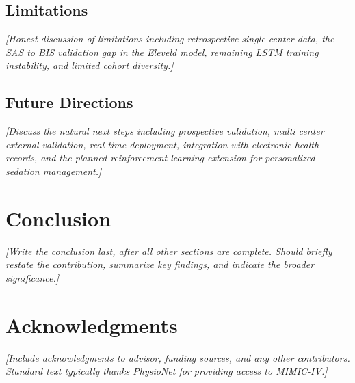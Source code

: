 \documentclass[11pt,a4paper]{article}
\newcommand{\placeholder}[1]{\textcolor{placeholdergray}{\textit{[#1]}}}
\begin{document}
\subsection{Limitations}

\placeholder{Honest discussion of limitations including retrospective
single center data, the SAS to BIS validation gap in the Eleveld model,
remaining LSTM training instability, and limited cohort diversity.}

\subsection{Future Directions}

\placeholder{Discuss the natural next steps including prospective
validation, multi center external validation, real time deployment,
integration with electronic health records, and the planned reinforcement
learning extension for personalized sedation management.}

%

\section{Conclusion}

\placeholder{Write the conclusion last, after all other sections are
complete. Should briefly restate the contribution, summarize key
findings, and indicate the broader significance.}


\section*{Acknowledgments}

\placeholder{Include acknowledgments to advisor, funding sources,
and any other contributors. Standard text typically thanks PhysioNet
for providing access to MIMIC-IV.}

%
\end{document}
